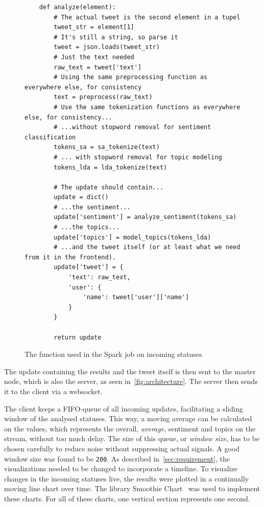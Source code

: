 \begin{figure}
    \caption{The function used in the Spark job on incoming statuses}
    \label{fig:spark_job}
    \begin{verbatim}
    def analyze(element):
        # The actual tweet is the second element in a tupel
        tweet_str = element[1]
        # It's still a string, so parse it
        tweet = json.loads(tweet_str)
        # Just the text needed
        raw_text = tweet['text']
        # Using the same preprocessing function as everywhere else, for consistency
        text = preprocess(raw_text)
        # Use the same tokenization functions as everywhere else, for consistency...
        # ...without stopword removal for sentiment classification
        tokens_sa = sa_tokenize(text)
        # ... with stopword removal for topic modeling
        tokens_lda = lda_tokenize(text)

        # The update should contain...
        update = dict()
        # ...the sentiment...
        update['sentiment'] = analyze_sentiment(tokens_sa)
        # ...the topics...
        update['topics'] = model_topics(tokens_lda)
        # ...and the tweet itself (or at least what we need from it in the frontend).
        update['tweet'] = {
            'text': raw_text,
            'user': {
                'name': tweet['user']['name']
            }
        }

        return update
    \end{verbatim}
\end{figure}

The update containing the results and the tweet itself is then sent to the master node,
which is also the server, as seen in~\autoref{fig:architecture}.
The server then sends it to the client via a websocket.
\par
The client keeps a FIFO-queue of all incoming updates, facilitating a sliding window of the analysed statuses.
This way, a moving average can be calculated on the values, which represents the overall, \textit{average},
sentiment and topics on the stream, without too much delay.
The size of this queue, or \textit{window size}, has to be chosen carefully to reduce noise without suppressing actual signals.
A good window size was found to be \texttt{200}.
As described in~\autoref{sec:requirement}, the visualizations needed to be changed to incorporate a timeline.
To visualize changes in the incoming statuses live, the results were plotted in a continually moving line chart over time.
The library Smoothie Chart~\cite{smoothieDocs} was used to implement these charts.
For all of these charts, one vertical section represents one second.

